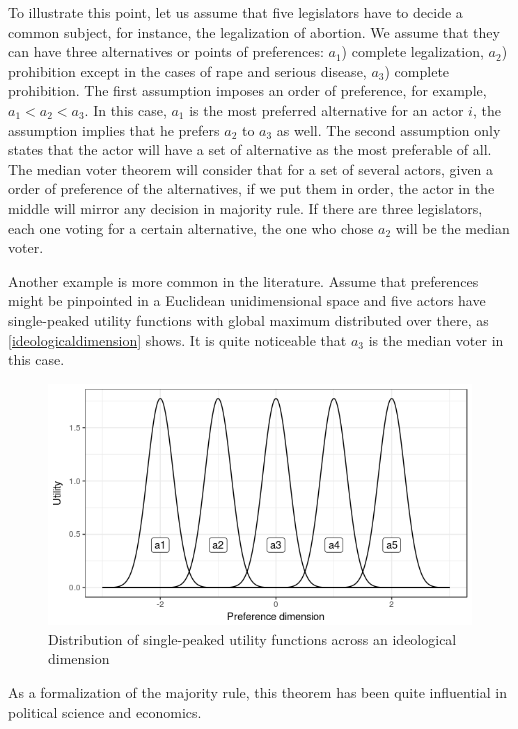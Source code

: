 \documentclass[12pt, a4paper]{article}
\begin{document}
To illustrate this point, let us assume that five legislators have to decide a common subject, for instance, the legalization of abortion. We assume that they can have three alternatives or points of preferences: $a_1$) complete legalization, $a_2$) prohibition except in the cases of rape and serious disease, $a_3$) complete prohibition. The first assumption imposes an order of preference, for example, $a_1 < a_2 < a_3$. In this case, $a_1$ is the most preferred alternative for an actor $i$, the assumption implies that he prefers
$a_2$ to $a_3$ as well. The second assumption only states that the actor will have a set of alternative as the most preferable of all. The median voter theorem will consider that for a set of several actors, given a order of preference of the alternatives, if we put them in order, the actor in the middle will mirror any decision in majority rule. If there are three legislators, each one voting for a certain alternative, the one who chose $a_2$ will be the median voter.

Another example is more common in the literature. Assume that preferences might be pinpointed in a Euclidean unidimensional space and five actors have single-peaked utility functions with global maximum distributed over there, as  \autoref{ideologicaldimension} shows. It is quite noticeable that $a_3$ is the median voter in this case.

\begin{figure}[htb]
\label{ideologicaldimension}
\caption{Distribution of single-peaked utility functions across an ideological dimension}
\includegraphics[scale=1]{figure_dimensions.png}
\centering
\end{figure}

As a formalization of the majority rule, this theorem has been quite influential in political science and economics. 
\end{document}
